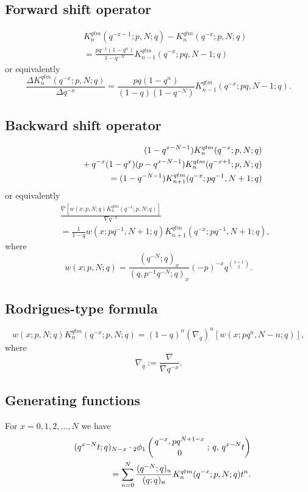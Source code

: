 \documentclass[envcountchap,graybox]{svmono}
\newcommand{\qhyp}[5]{\mbox{}_{#1}{\phi}_{#2}
\left(\genfrac{}{}{0pt}{}{#3}{#4}\,;\,q,\,#5\right)}
\newcommand{\mathindent}{\hspace{7.5mm}}
\newcommand{\qhyp}[5]{\,\mbox{}_{#1}\phi_{#2}\!\left(
  \genfrac{}{}{0pt}{}{#3}{#4};#5\right)}
\begin{document}
\subsection*{Forward shift operator}
\begin{eqnarray}
\label{shift1QuantumqKrawtchoukI}
& &K_n^{qtm}(q^{-x-1};p,N;q)-K_n^{qtm}(q^{-x};p,N;q)\nonumber\\
& &{}=\frac{pq^{-x}(1-q^n)}{1-q^{-N}}K_{n-1}^{qtm}(q^{-x};pq,N-1;q)
\end{eqnarray}
or equivalently
\begin{equation}
\label{shift1QuantumqKrawtchoukII}
\frac{\Delta K_n^{qtm}(q^{-x};p,N;q)}{\Delta q^{-x}}=
\frac{pq(1-q^n)}{(1-q)(1-q^{-N})}K_{n-1}^{qtm}(q^{-x};pq,N-1;q).
\end{equation}

\subsection*{Backward shift operator}
\begin{eqnarray}
\label{shift2QuantumqKrawtchoukI}
& &(1-q^{x-N-1})K_n^{qtm}(q^{-x};p,N;q)\nonumber\\
& &{}\mathindent{}+q^{-x}(1-q^x)(p-q^{x-N-1})K_n^{qtm}(q^{-x+1};p,N;q)\nonumber\\
& &{}=(1-q^{-N-1})K_{n+1}^{qtm}(q^{-x};pq^{-1},N+1;q)
\end{eqnarray}
or equivalently
\begin{eqnarray}
\label{shift2QuantumqKrawtchoukII}
& &\frac{\nabla\left[w(x;p,N;q)K_n^{qtm}(q^{-x};p,N;q)\right]}{\nabla q^{-x}}\nonumber\\
& &{}=\frac{1}{1-q}w(x;pq^{-1},N+1;q)K_{n+1}^{qtm}(q^{-x};pq^{-1},N+1;q),
\end{eqnarray}
where
$$w(x;p,N;q)=\frac{(q^{-N};q)_x}{(q,p^{-1}q^{-N};q)_x}(-p)^{-x}q^{\binom{x+1}{2}}.$$

\subsection*{Rodrigues-type formula}
\begin{equation}
\label{RodQuantumqKrawtchouk}
w(x;p,N;q)K_n^{qtm}(q^{-x};p,N;q)=(1-q)^n\left(\nabla_q\right)^n\left[w(x;pq^n,N-n;q)\right],
\end{equation}
where
$$\nabla_q:=\frac{\nabla}{\nabla q^{-x}}.$$

\subsection*{Generating functions} For $x=0,1,2,\ldots,N$ we have
\begin{eqnarray}
\label{GenQuantumqKrawtchouk1}
& &(q^{x-N}t;q)_{N-x}\cdot\qhyp{2}{1}{q^{-x},pq^{N+1-x}}{0}{q^{x-N}t}\nonumber\\
& &{}=\sum_{n=0}^N\frac{(q^{-N};q)_n}{(q;q)_n}K_n^{qtm}(q^{-x};p,N;q)t^n.
\end{eqnarray}
\end{document}
